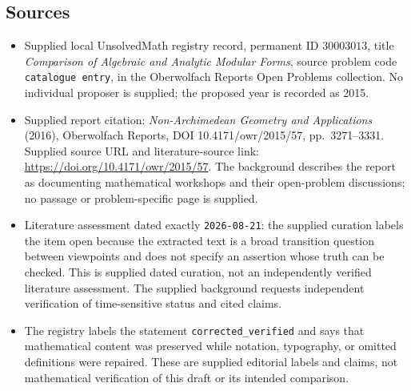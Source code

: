 \documentclass[11pt]{article}
\begin{document}
\subsection{Sources}
\begin{itemize}
\item Supplied local UnsolvedMath registry record, permanent ID \(30003013\), title \emph{Comparison of Algebraic and Analytic Modular Forms}, source problem code \texttt{catalogue entry}, in the Oberwolfach Reports Open Problems collection. No individual proposer is supplied; the proposed year is recorded as 2015.
\item Supplied report citation: \emph{Non-Archimedean Geometry and Applications} (2016), Oberwolfach Reports, DOI 10.4171/owr/2015/57, pp.\ 3271--3331. Supplied source URL and literature-source link: \url{https://doi.org/10.4171/owr/2015/57}. The background describes the report as documenting mathematical workshops and their open-problem discussions; no passage or problem-specific page is supplied.
\item Literature assessment dated exactly \texttt{2026-08-21}: the supplied curation labels the item open because the extracted text is a broad transition question between viewpoints and does not specify an assertion whose truth can be checked. This is supplied dated curation, not an independently verified literature assessment. The supplied background requests independent verification of time-sensitive status and cited claims.
\item The registry labels the statement \texttt{corrected\_verified} and says that mathematical content was preserved while notation, typography, or omitted definitions were repaired. These are supplied editorial labels and claims, not mathematical verification of this draft or its intended comparison.
\end{itemize}
\end{document}
